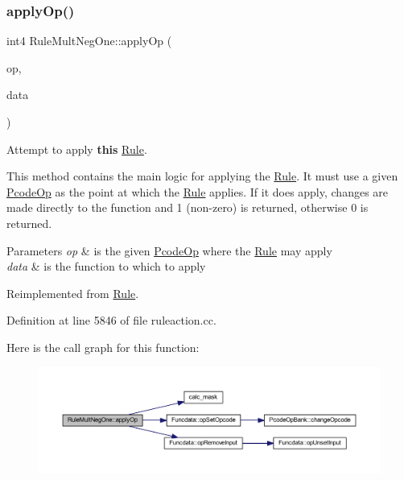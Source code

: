 \subsubsection{\texorpdfstring{applyOp()}{applyOp()}}
{\footnotesize\ttfamily int4 Rule\+Mult\+Neg\+One\+::apply\+Op (\begin{DoxyParamCaption}\item[{\mbox{\hyperlink{class_pcode_op}{Pcode\+Op}} $\ast$}]{op,  }\item[{\mbox{\hyperlink{class_funcdata}{Funcdata}} \&}]{data }\end{DoxyParamCaption})\hspace{0.3cm}{\ttfamily [virtual]}}



Attempt to apply {\bfseries{this}} \mbox{\hyperlink{class_rule}{Rule}}. 

This method contains the main logic for applying the \mbox{\hyperlink{class_rule}{Rule}}. It must use a given \mbox{\hyperlink{class_pcode_op}{Pcode\+Op}} as the point at which the \mbox{\hyperlink{class_rule}{Rule}} applies. If it does apply, changes are made directly to the function and 1 (non-\/zero) is returned, otherwise 0 is returned. 
\begin{DoxyParams}{Parameters}
{\em op} & is the given \mbox{\hyperlink{class_pcode_op}{Pcode\+Op}} where the \mbox{\hyperlink{class_rule}{Rule}} may apply \\
\hline
{\em data} & is the function to which to apply \\
\hline
\end{DoxyParams}


Reimplemented from \mbox{\hyperlink{class_rule_a4e3e61f066670175009f60fb9dc60848}{Rule}}.



Definition at line 5846 of file ruleaction.\+cc.

Here is the call graph for this function\+:
\nopagebreak
\begin{figure}[H]
\begin{center}
\leavevmode
\includegraphics[width=350pt]{class_rule_mult_neg_one_a3a1d3552604a9d5464f23ef332376918_cgraph}
\end{center}
\end{figure}
\mbox{\label{class_rule_mult_neg_one_a0d2b0402af95e0c0c3966213a5248581}} 
